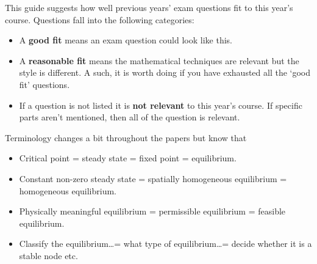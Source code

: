 
\usepackage{multicol}
\setlength{\columnsep}{3pc}
\setlength\columnseprule{.4pt}
 
%

This guide suggests how well previous years' exam questions fit to this year's course. Questions fall into the following categories:
\begin{itemize}
	\item A \textbf{good fit} means an exam question could look like this.
	\item A \textbf{reasonable fit} means the mathematical techniques are relevant but the style is different. A such, it is worth doing if you have exhausted all the `good fit' questions.
	\item If a question is not listed it is \textbf{not relevant} to this year's course. If specific parts aren't mentioned, then all of the question is relevant.
\end{itemize}

Terminology changes a bit throughout the papers but know that
\begin{itemize}
	\item Critical point = steady state = fixed point = equilibrium.
	\item Constant non-zero steady state = spatially homogeneous equilibrium = homogeneous equilibrium.
	\item Physically meaningful equilibrium = permissible equilibrium = feasible equilibrium.
	\item Classify the equilibrium\dots = what type of equilibrium\dots = decide whether it is a stable node etc.
\end{itemize}

\vspace{1cm}

